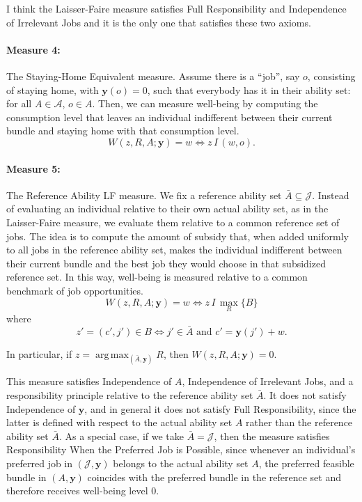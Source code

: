 \documentclass[12pt,thmsb]{article}
\DeclareMathOperator*{\argmax}{arg\,max}
\begin{document}
I think the Laisser-Faire measure satisfies Full Responsibility and Independence of Irrelevant Jobs and it is the only one that satisfies these two axioms.

\paragraph{Measure 4:} The Staying-Home Equivalent measure. Assume there is a ``job'', say $o$, consisting of staying home, with $\mathbf{y}(o)=0$, such that everybody has it in their ability set: for all $A\in\mathcal{A}$, $o\in A$. Then, we can measure well-being by computing the consumption level that leaves an individual indifferent between their current bundle and staying home with that consumption level.
\begin{equation*}
W(z, R, A;\mathbf{y})=w\Leftrightarrow z\,I\,(w,o).
\end{equation*}

\paragraph{Measure 5:} The Reference Ability LF measure. We fix a reference ability set $\bar{A}\subseteq \mathcal{J}$. Instead of evaluating an individual relative to their own actual ability set, as in the Laisser-Faire measure, we evaluate them relative to a common reference set of jobs. The idea is to compute the amount of subsidy that, when added uniformly to all jobs in the reference ability set, makes the individual indifferent between their current bundle and the best job they would choose in that subsidized reference set. In this way, well-being is measured relative to a common benchmark of job opportunities.
\begin{equation*}
W(z,R,A;\mathbf{y})=w
\Leftrightarrow
z\,I\,\max_R\{B\}
\end{equation*}
where
\begin{equation*}
z'=(c',j')\in B
\Leftrightarrow
j'\in \bar{A}
\textrm{ and }
c'=\mathbf{y}(j')+w.
\end{equation*}

In particular, if $z=\argmax_{(\bar{A},\mathbf{y})}R$, then $W(z,R,A;\mathbf{y})=0$.

This measure satisfies Independence of $A$, Independence of Irrelevant Jobs, and a responsibility principle relative to the reference ability set $\bar{A}$. It does not satisfy Independence of $\mathbf{y}$, and in general it does not satisfy Full Responsibility, since the latter is defined with respect to the actual ability set $A$ rather than the reference ability set $\bar{A}$. As a special case, if we take $\bar{A}=\mathcal{J}$, then the measure satisfies Responsibility When the Preferred Job is Possible, since whenever an individual's preferred job in $(\mathcal{J},\mathbf{y})$ belongs to the actual ability set $A$, the preferred feasible bundle in $(A,\mathbf{y})$ coincides with the preferred bundle in the reference set and therefore receives well-being level $0$.
\end{document}
